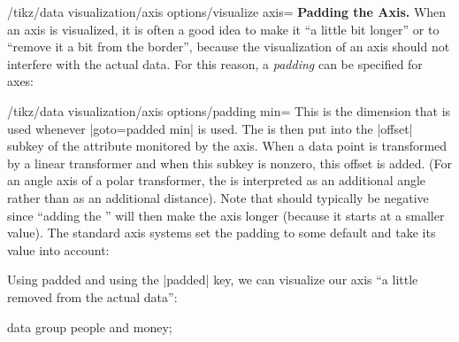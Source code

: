 \begin{key}{/tikz/data visualization/axis options/visualize axis=}
    \medskip
    \textbf{Padding the Axis.}
    When an axis is visualized, it is often a good idea to make it ``a little
    bit longer'' or to ``remove it a bit from the border'', because the
    visualization of an axis should not interfere with the actual data. For
    this reason, a \emph{padding} can be specified for axes:

    \begin{key}{/tikz/data visualization/axis options/padding min=}
        This is the dimension that is used whenever |goto=padded min| is used.
        The  is then put into the |offset| subkey of the
        attribute monitored by the axis. When a data point is transformed by a
        linear transformer and when this subkey is nonzero, this offset is
        added. (For an angle axis of a polar transformer, the 
        is interpreted as an additional angle rather than as an additional
        distance). Note that  should typically be negative
        since ``adding the '' will then make the axis longer
        (because it starts at a smaller value). The standard axis systems set
        the padding to some default and take its value into account:
\begin{codeexample}[width=8cm]
\end{codeexample}

        Using padded and using the |padded| key, we can visualize our axis ``a
        little removed from the actual data'':
\begin{codeexample}[]
\tikz \datavisualization [
    our system,
    x axis={attribute=time, length=3cm},
    left axis ={attribute=money},
    right axis={attribute=people},
    visualize as line/.list={people 1, people 2, money 1, money 2}]
  data group {people and money};
\end{codeexample}
    \end{key}


\end{key}
